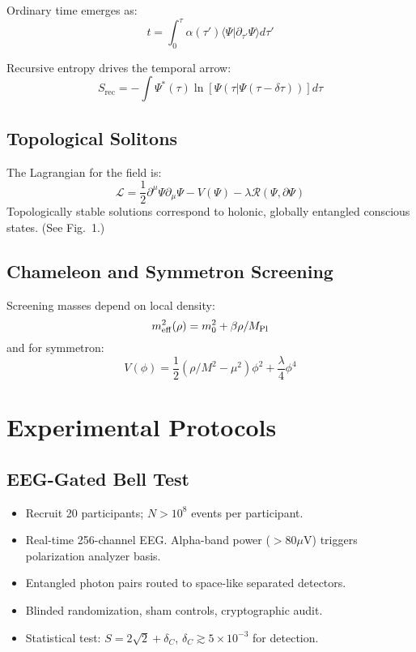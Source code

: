 \documentclass[aps,prx,twocolumn,nofootinbib,superscriptaddress,longbibliography]{revtex4-2}
\begin{document}
Ordinary time emerges as:
\begin{equation}
    t = \int_0^{\tau} \alpha(\tau') \langle \Psi | \partial_{\tau'} \Psi \rangle d\tau'
\end{equation}

Recursive entropy drives the temporal arrow:
\begin{equation}
    S_\text{rec} = -\int \Psi^*(\tau) \ln[\Psi(\tau|\Psi(\tau-\delta\tau))] d\tau
\end{equation}

\subsection{Topological Solitons}
The Lagrangian for the field is:
\begin{equation}
    \mathcal{L} = \frac{1}{2} \partial^\mu \Psi \partial_\mu \Psi - V(\Psi) - \lambda \mathcal{R}(\Psi, \partial\Psi)
\end{equation}
Topologically stable solutions correspond to holonic, globally entangled conscious states. (See Fig.~1.)

\subsection{Chameleon and Symmetron Screening}
Screening masses depend on local density:
\begin{equation}
    m_{\rm eff}^2(\rho) = m_0^2 + \beta\rho/M_{\rm Pl}
\end{equation}
and for symmetron:
\begin{equation}
    V(\phi) = \frac12(\rho/M^2-\mu^2)\phi^2 + \frac{\lambda}{4}\phi^4
\end{equation}

\section{Experimental Protocols}

\subsection{EEG-Gated Bell Test}
\begin{itemize}
    \item Recruit 20 participants; $N > 10^8$ events per participant.
    \item Real-time 256-channel EEG. Alpha-band power ($>80 \mu$V) triggers polarization analyzer basis.
    \item Entangled photon pairs routed to space-like separated detectors.
    \item Blinded randomization, sham controls, cryptographic audit.
    \item Statistical test: $S = 2\sqrt{2} + \delta_C$, $\delta_C \gtrsim 5 \times 10^{-3}$ for detection.
\end{itemize}
\end{document}
